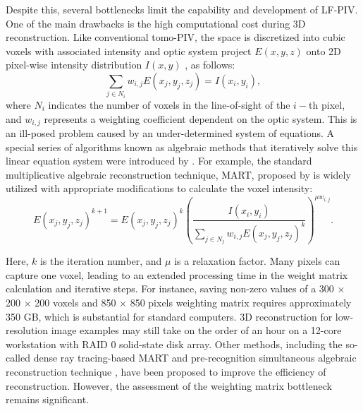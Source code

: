 \documentclass[draftthesis,fullpage]{uiucthesis}
\begin{document}
Despite this, several bottlenecks limit the capability and development of LF-PIV. One of the main drawbacks is the high computational cost during 3D reconstruction. Like conventional tomo-PIV, the space is discretized into cubic voxels with associated intensity and optic system project $E(x,y,z)$ onto 2D pixel-wise intensity distribution $I(x,y)$ \citep{fahringer2015volumetric}, as follows:
\begin{equation}
  \sum_{j \in N_{i}} w_{i,j} E\left(x_j, y_j, z_j\right)=I\left(x_i, y_i\right),
  \label{LF_principle}
\end{equation}
where $N_i$ indicates the number of voxels in the line-of-sight of the $i-$th pixel, and $w_{i,j}$ represents a weighting coefficient dependent on the optic system. This is an ill-posed problem caused by an under-determined system of equations. A special series of algorithms known as algebraic methods that iteratively solve this linear equation system were introduced by \citet{herman1976iterative}. For example, the standard multiplicative algebraic reconstruction technique, MART, proposed by \citet{belden2010three} is widely utilized with appropriate modifications to calculate the voxel intensity:
\begin{equation}
       E\left(x_j,y_j,z_j\right)^{k+1}=E\left(x_j,y_j,z_j\right)^{k}\left(\frac{I\left(x_i, y_i\right)}{\sum_{j \in N_j} w_{i,j} E\left(x_j, y_j, z_j\right)^k}\right)^{\mu w_{i, j}}.
       \label{LF_MART}
\end{equation}

Here, $k$ is the iteration number, and $\mu$ is a relaxation factor. Many pixels can capture one voxel, leading to an extended processing time in the weight matrix calculation and iterative steps. For instance, saving non-zero values of a 300 $\times$ 200 $\times$ 200 voxels and 850 $\times$ 850 pixels weighting matrix requires approximately 350 GB, which is substantial for standard computers. 3D reconstruction for low-resolution image examples may still take on the order of an hour on a 12-core workstation with RAID 0 solid-state disk array.  Other methods, including the so-called dense ray tracing-based MART \citep{shi2017light} and pre-recognition simultaneous algebraic reconstruction technique \citep{zhu2021pre}, have been proposed to improve the efficiency of reconstruction. However, the assessment of the weighting matrix bottleneck remains significant.  
\end{document}

